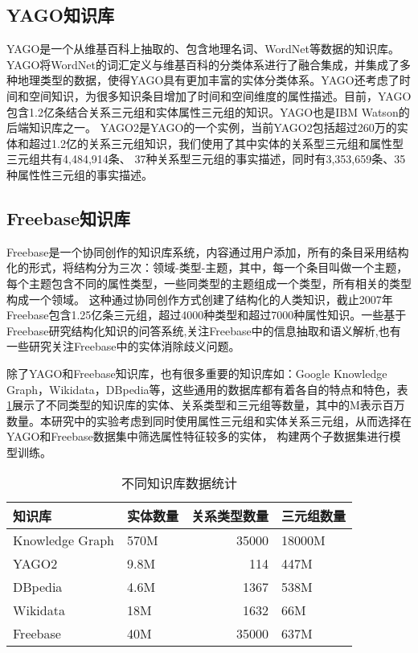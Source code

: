 \subsection{YAGO知识库}
YAGO是一个从维基百科上抽取的、包含地理名词、WordNet\cite{Kasneci2008TheYA}等数据的知识库。
YAGO将WordNet的词汇定义与维基百科的分类体系进行了融合集成\cite{Suchanek2008YAGOAL}，并集成了多种地理类型的数据，使得YAGO具有更加丰富的实体分类体系。YAGO还考虑了时间和空间知识\cite{Hoffart2011YAGO2EA}，为很多知识条目增加了时间和空间维度的属性描述。目前，YAGO包含1.2亿条结合关系三元组和实体属性三元组的知识。YAGO也是IBM Watson\cite{Ferrucci2010BuildingWA}的后端知识库之一。
YAGO2\cite{Hoffart2013YAGO2AS}是YAGO的一个实例，当前YAGO2包括超过260万的实体和超过1.2亿的关系三元组知识，我们使用了其中实体的关系型三元组和属性型三元组共有4,484,914条、
37种关系型三元组的事实描述，同时有3,353,659条、35种属性性三元组的事实描述。

\subsection{Freebase知识库}
Freebase\cite{Bollacker2008FreebaseAC}是一个协同创作的知识库系统，内容通过用户添加，所有的条目采用结构化的形式，将结构分为三次：领域-类型-主题，其中，每一个条目叫做一个主题，每个主题包含不同的属性类型，一些同类型的主题组成一个类型，所有相关的类型构成一个领域。
这种通过协同创作方式创建了结构化的人类知识，截止2007年Freebase包含1.25亿条三元组，超过4000种类型和超过7000种属性知识。一些基于Freebase研究结构化知识的问答系统\cite{Yao2014InformationEO}\cite{Yao2015LeanQA},关注Freebase中的信息抽取和语义解析\cite{Yao2014FreebaseQI},也有一些研究关注Freebase中的实体消除歧义问题\cite{Zheng2012EntityDW}。

除了YAGO和Freebase知识库，也有很多重要的知识库如：Google Knowledge Graph，Wikidata，DBpedia等，这些通用的数据库都有着各自的特点和特色，表\ref{tab:addlabel-kb-list}展示了不同类型的知识库的实体、关系类型和三元组等数量，其中的M表示百万数量。本研究中的实验考虑到同时使用属性三元组和实体关系三元组，从而选择在YAGO和Freebase数据集中筛选属性特征较多的实体，
构建两个子数据集进行模型训练。

\begin{table}[htbp]
  \centering
  \caption{不同知识库数据统计}
    \begin{tabular}{|l|l|r|l|}
    \hline
    知识库   & 实体数量  & \multicolumn{1}{l|}{关系类型数量} & 三元组数量 \\
    \hline
    Knowledge Graph & 570M  & 35000 & 18000M \\
    \hline
    YAGO2 & 9.8M  & 114   & 447M \\
    \hline
    DBpedia & 4.6M  & 1367  & 538M \\
    \hline
    Wikidata & 18M   & 1632  & 66M \\
    \hline
    Freebase & 40M   & 35000 & 637M \\
    \hline
    \end{tabular}%
  \label{tab:addlabel-kb-list}%
\end{table}%


